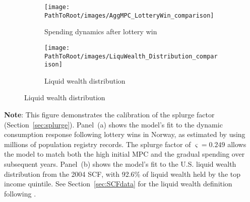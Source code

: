 \documentclass[\PathToRoot/\ProjectName]{subfiles}
\begin{document}
\begin{figure}[H]
  \centering
  \caption{Model fit to spending behavior and wealth distribution}
  \whenintegrated{\label{fig:splurge_estimation}} 
  \noindent\begin{minipage}{\textwidth}
    \centering
    \begin{subfigure}[b]{.48\linewidth}
      \centering
      \texttt{[image: \\PathToRoot/images/AggMPC\_LotteryWin\_comparison]}
      \caption{Spending dynamics after lottery win}
      \whenintegrated{\label{fig:aggmpclotterywin}} 
    \end{subfigure}
    \hfill
    \begin{subfigure}[b]{.48\linewidth}
      \centering
      \texttt{[image: \\PathToRoot/images/LiquWealth\_Distribution\_comparison]}
      \caption{Liquid wealth distribution}
      \whenintegrated{\label{fig:liquwealthdistribution}} 
    \end{subfigure}
  \end{minipage}
\end{figure}
\noindent\parbox{\textwidth}{\footnotesize
  \textbf{Note}: This figure demonstrates the calibration of the splurge factor (Section~\ref{sec:splurge}).
  Panel~(a) shows the model's fit to the dynamic consumption response following lottery wins in Norway,
  as estimated by \cite{fagereng-mpc-2021} using millions of population registry records.
  The splurge factor of $\varsigma = 0.249$ allows the model to match both the high initial MPC
  and the gradual spending over subsequent years.
  Panel~(b) shows the model's fit to the U.S. liquid wealth distribution from the 2004 SCF,
  with 92.6\% of liquid wealth held by the top income quintile.
  See Section~\ref{sec:SCFdata} for the liquid wealth definition following \cite{kaplan2014model}.
}

\vspace{0.5em}  

\smartbib
\end{document}
